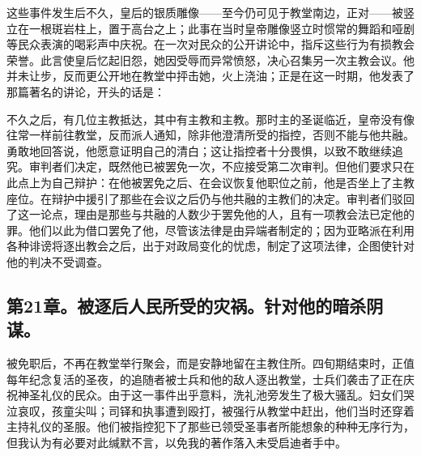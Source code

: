 这些事件发生后不久，皇后的银质雕像——至今仍可见于教堂南边，正对——被竖立在一根斑岩柱上，置于高台之上；此事在当时皇帝雕像竖立时惯常的舞蹈和哑剧等民众表演的喝彩声中庆祝。在一次对民众的公开讲论中，指斥这些行为有损教会荣誉。此言使皇后忆起旧怨，她因受辱而异常愤怒，决心召集另一次主教会议。他并未让步，反而更公开地在教堂中抨击她，火上浇油；正是在这一时期，他发表了那篇著名的讲论，开头的话是：\par

不久之后，有几位主教抵达，其中有主教和主教。那时主的圣诞临近，皇帝没有像往常一样前往教堂，反而派人通知，除非他澄清所受的指控，否则不能与他共融。勇敢地回答说，他愿意证明自己的清白；这让指控者十分畏惧，以致不敢继续追究。审判者们决定，既然他已被罢免一次，不应接受第二次审判。但他们要求只在此点上为自己辩护：在他被罢免之后、在会议恢复他职位之前，他是否坐上了主教座位。在辩护中援引了那些在会议之后仍与他共融的主教们的决定。审判者们驳回了这一论点，理由是那些与共融的人数少于罢免他的人，且有一项教会法已定他的罪。他们以此为借口罢免了他，尽管该法律是由异端者制定的；因为亚略派在利用各种诽谤将逐出教会之后，出于对政局变化的忧虑，制定了这项法律，企图使针对他的判决不受调查。\par


\subsection{第21章。被逐后人民所受的灾祸。针对他的暗杀阴谋。}

被免职后，不再在教堂举行聚会，而是安静地留在主教住所。四旬期结束时，正值每年纪念复活的圣夜，的追随者被士兵和他的敌人逐出教堂，士兵们袭击了正在庆祝神圣礼仪的民众。由于这一事件出乎意料，洗礼池旁发生了极大骚乱。妇女们哭泣哀叹，孩童尖叫；司铎和执事遭到殴打，被强行从教堂中赶出，他们当时还穿着主持礼仪的圣服。他们被指控犯下了那些已领受圣事者所能想象的种种无序行为，但我认为有必要对此缄默不言，以免我的著作落入未受启迪者手中。\par

